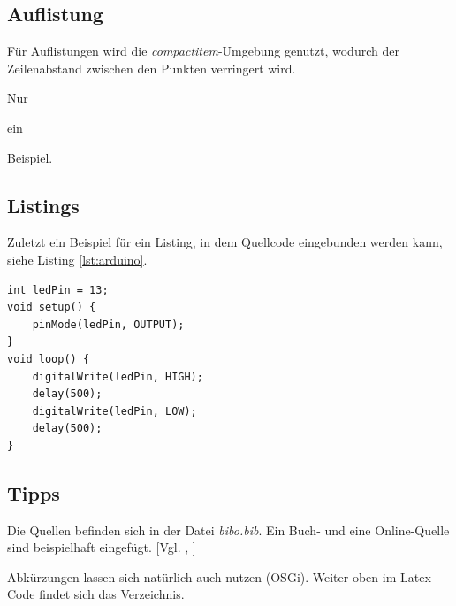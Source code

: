\documentclass[12pt,a4paper,bibliography=totocnumbered,listof=totocnumbered]{scrartcl}
\begin{document}
\pagebreak
\subsection{Auflistung}
Für Auflistungen wird die \textit{compactitem}-Umgebung genutzt, wodurch der Zeilenabstand zwischen den Punkten verringert wird.

\begin{compactitem}
	\item Nur
	\item ein
	\item Beispiel.
\end{compactitem}

\subsection{Listings}
Zuletzt ein Beispiel für ein Listing, in dem Quellcode eingebunden werden kann, siehe Listing \ref{lst:arduino}.

\vspace{1em}
\begin{lstlisting}[caption=Arduino Beispielprogramm, label=lst:arduino]
int ledPin = 13;
void setup() {
    pinMode(ledPin, OUTPUT);
}
void loop() {
    digitalWrite(ledPin, HIGH);
    delay(500);
    digitalWrite(ledPin, LOW);
    delay(500);
}
\end{lstlisting}

\subsection{Tipps}
Die Quellen befinden sich in der Datei \textit{bibo.bib}. Ein Buch- und eine Online-Quelle sind beispielhaft eingefügt. [Vgl. \cite{buch}, \cite{online}]

Abkürzungen lassen sich natürlich auch nutzen (\ac{OSGi}). Weiter oben im Latex-Code findet sich das Verzeichnis.
\pagebreak
\end{document}
